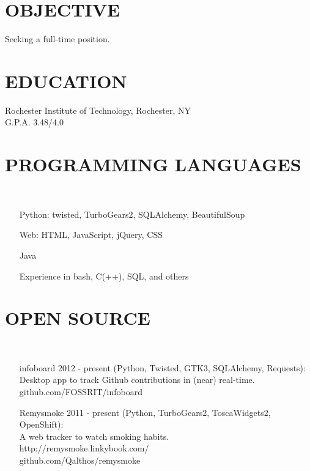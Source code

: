 \documentclass[margin]{res}
\begin{document}

\begin{resume}

\section{OBJECTIVE}
    Seeking a full-time position.

\section{EDUCATION}
    Rochester Institute of Technology, Rochester, NY \\
    G.P.A. 3.48/4.0

\section{PROGRAMMING LANGUAGES}\\
    \begin{itemize}
        \item[] Python: twisted, TurboGears2, SQLAlchemy, BeautifulSoup
        \item[] Web: HTML, JavaScript, jQuery, CSS
        \item[] Java
        \item[] Experience in bash, C(++), SQL, and others
    \end{itemize}

\section{OPEN SOURCE}\\
    \begin{itemize}
        \item[infoboard]
            2012 - present (Python, Twisted, GTK3, SQLAlchemy, Requests):\\
            Desktop app to track Github contributions in (near) real-time.\\
            github.com/FOSSRIT/infoboard

        \item[Remysmoke]
            2011 - present (Python, TurboGears2, ToscaWidgets2, OpenShift):\\
            A web tracker to watch smoking habits.\\
            http://remysmoke.linkybook.com/\\
            github.com/Qalthos/remysmoke


\end{itemize}
\end{resume}
\end{document}
